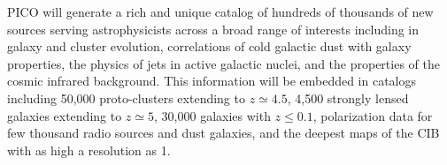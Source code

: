 \documentclass[PICOAPC.tex]{subfiles}
\begin{document}

PICO will generate a rich and unique catalog of hundreds of thousands of new sources serving astrophysicists across a broad range of interests including in galaxy and cluster evolution, correlations of cold galactic dust with galaxy properties, the physics of jets in active galactic nuclei, and the properties of the cosmic infrared background. This information will be embedded in catalogs including 50,000 proto-clusters extending to $z\simeq 4.5$, 4,500 strongly lensed galaxies extending to $z\simeq 5$, 30,000 galaxies with $z\leq 0.1$, polarization data for few thousand radio sources and dust galaxies, and the deepest maps of the CIB with as high a resolution as 1\arcmin . 
\end{document}

